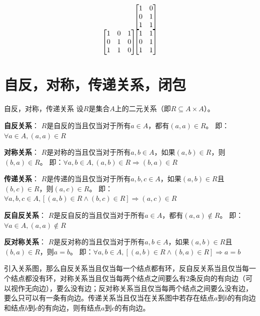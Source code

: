 \[
\begin{array}{c@{\hspace{-2pt}}c}
 & 
\begin{bmatrix}
1 & 0 \\
0 & 1 \\
1 & 1
\end{bmatrix} \\[8pt]
\begin{bmatrix}
1 & 0 & 1 \\
0 & 1 & 0 \\
1 & 1 & 0
\end{bmatrix} & 
\begin{bmatrix}
1 & 1 \\
0 & 1 \\
1 & 1
\end{bmatrix}
\end{array}
\]
\section{自反，对称，传递关系，闭包}
\begin{definition}{自反，对称，传递关系}{}
设$R$是集合$A$上的二元关系（即$R \subseteq A \times A$）。

\textbf{自反关系}：
$R$是自反的当且仅当对于所有$a \in A$，都有$(a,a) \in R$。
即：$\forall a \in A, (a,a) \in R$

\textbf{对称关系}：
$R$是对称的当且仅当对于所有$a,b \in A$，如果$(a,b) \in R$，则$(b,a) \in R$。
即：$\forall a,b \in A, (a,b) \in R \Rightarrow (b,a) \in R$

\textbf{传递关系}：
$R$是传递的当且仅当对于所有$a,b,c \in A$，如果$(a,b) \in R$且$(b,c) \in R$，则$(a,c) \in R$。
即：$\forall a,b,c \in A, [(a,b) \in R \land (b,c) \in R] \Rightarrow (a,c) \in R$

\textbf{反自反关系}：
$R$是反自反的当且仅当对于所有$a \in A$，都有$(a,a) \notin R$。
即：$\forall a \in A, (a,a) \notin R$

\textbf{反对称关系}：
$R$是反对称的当且仅当对于所有$a,b \in A$，如果$(a,b) \in R$且$(b,a) \in R$，则$a = b$。
即：$\forall a,b \in A, [(a,b) \in R \land (b,a) \in R] \Rightarrow a = b$
\end{definition}
引入关系图，那么自反关系当且仅当每一个结点都有环，反自反关系当且仅当每一个结点都没有环，对称关系当且仅当每两个结点之间要么有2条反向的有向边（可以视作无向边），要么没有边；反对称关系当且仅当每两个结点之间要么没有边，要么只可以有一条有向边。传递关系当且仅当在关系图中若存在结点$a$到$b$的有向边和结点$b$到$c$的有向边，则有结点$a$到$c$的有向边。


